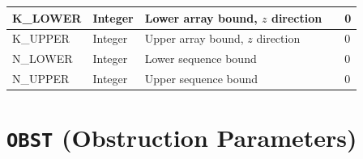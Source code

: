 \documentclass[11pt]{book}
\begin{document}
\begin{longtable}{@{\extracolsep{\fill}}|l|l|l|l|l|}
{\ct K\_LOWER}       & Integer          & Lower array bound, $z$ direction            &    & 0                          \\ \hline
{\ct K\_UPPER}       & Integer          & Upper array bound, $z$ direction            &    & 0                          \\ \hline
{\ct N\_LOWER}       & Integer          & Lower sequence bound                        &    & 0                          \\ \hline
{\ct N\_UPPER}       & Integer          & Upper sequence bound                        &    & 0                          \\ \hline
\end{longtable}


\vspace{\baselineskip}



\section{\texorpdfstring{{\tt OBST}}{OBST} (Obstruction Parameters)}
\end{document}

